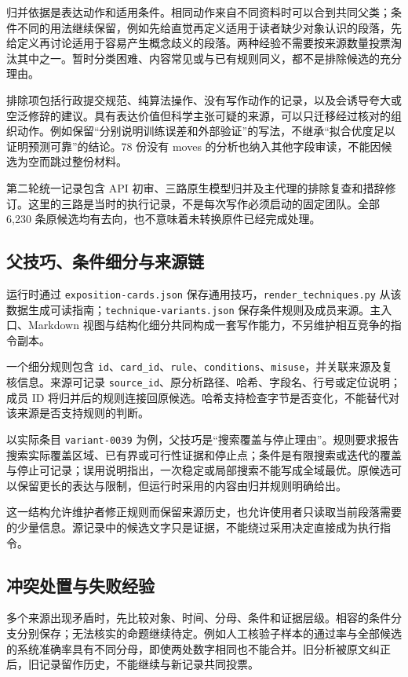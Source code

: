 \documentclass[UTF8,a4paper,zihao=-4,fontset=fandol]{ctexart}
\newcommand{\code}[1]{\texttt{\small #1}}
\begin{document}
归并依据是表达动作和适用条件。相同动作来自不同资料时可以合到共同父类；条件不同的用法继续保留，例如先给直觉再定义适用于读者缺少对象认识的段落，先给定义再讨论适用于容易产生概念歧义的段落。两种经验不需要按来源数量投票淘汰其中之一。暂时分类困难、内容常见或与已有规则同义，都不是排除候选的充分理由。

排除项包括行政提交规范、纯算法操作、没有写作动作的记录，以及会诱导夸大或空泛修辞的建议。具有表达价值但科学主张可疑的来源，可以只迁移经过核对的组织动作。例如保留“分别说明训练误差和外部验证”的写法，不继承“拟合优度足以证明预测可靠”的结论。78 份没有 moves 的分析也纳入其他字段审读，不能因候选为空而跳过整份材料。

第二轮统一记录包含 API 初审、三路原生模型归并及主代理的排除复查和措辞修订。这里的三路是当时的执行记录，不是每次写作必须启动的固定团队。全部 6,230 条原候选均有去向，也不意味着未转换原件已经完成处理。

\subsection{父技巧、条件细分与来源链}

运行时通过 \code{exposition-cards.json} 保存通用技巧，\code{render\_techniques.py} 从该数据生成可读指南；\code{technique-variants.json} 保存条件规则及成员来源。主入口、Markdown 视图与结构化细分共同构成一套写作能力，不另维护相互竞争的指令副本\cite{writing,query}。

一个细分规则包含 \code{id}、\code{card\_id}、\code{rule}、\code{conditions}、\code{misuse}，并关联来源及复核信息。来源可记录 \code{source\_id}、原分析路径、哈希、字段名、行号或定位说明；成员 ID 将归并后的规则连接回原候选。哈希支持检查字节是否变化，不能替代对该来源是否支持规则的判断。

以实际条目 \code{variant-0039} 为例，父技巧是“搜索覆盖与停止理由”。规则要求报告搜索实际覆盖区域、已有界或可行性证据和停止点；条件是有限搜索或迭代的覆盖与停止可记录；误用说明指出，一次稳定或局部搜索不能写成全域最优。原候选可以保留更长的表达与限制，但运行时采用的内容由归并规则明确给出。

这一结构允许维护者修正规则而保留来源历史，也允许使用者只读取当前段落需要的少量信息。源记录中的候选文字只是证据，不能绕过采用决定直接成为执行指令。

\subsection{冲突处置与失败经验}

多个来源出现矛盾时，先比较对象、时间、分母、条件和证据层级。相容的条件分支分别保存；无法核实的命题继续待定。例如人工核验子样本的通过率与全部候选的系统准确率具有不同分母，即使两处数字相同也不能合并。旧分析被原文纠正后，旧记录留作历史，不能继续与新记录共同投票\cite{conflicts}。
\end{document}
